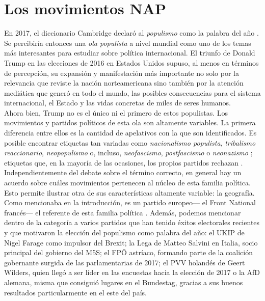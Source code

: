 \chapter{Los movimientos NAP}

En 2017, el diccionario Cambridge declaró al \textit{populismo} como la palabra del año \parencite{MuddeCambridge17}. Se percibiría entonces una \textit{ola populista} a nivel mundial como uno de los temas más interesantes para estudiar sobre política internacional. El triunfo de Donald Trump en las elecciones de 2016 en Estados Unidos supuso, al menos en términos de percepción, su expansión y manifestación más importante no solo por la relevancia que reviste la nación norteamericana sino también por la atención mediática que generó en todo el mundo, las posibles consecuencias para el sistema internacional, el Estado y las vidas concretas de miles de seres humanos.\\

Ahora bien, Trump no es el único ni el primero de estos populistas. Los movimientos y partidos políticos de esta ola son altamente variables. La primera diferencia entre ellos es la cantidad de apelativos con la que son identificados. Es posible encontrar etiquetas tan variadas como \textit{nacionalismo populista}, \textit{tribalismo reaccionario}, \textit{neopopulismo} o, incluso, \textit{neofascismo}, \textit{postfascismo} o \textit{neonazismo} \parencites{Mudde07a}{Mammone12}{Hainsworth16a}; etiquetas que, en la mayoría de las ocasiones, los propios partidos rechazan \parencites{LeParisien13}{Hainsworth16a}{Sputnik17}.\\ 

Independientemente del debate sobre el término correcto, en general hay un acuerdo sobre cuáles movimientos pertenecen al núcleo de esta familia política. Esto permite ilustrar otra de sus características altamente variable: la geografía. Como mencionaba en la introducción, es un partido europeo--- el Front National francés--- el referente de esta familia política \parencite{Mudde07a}. Además, podemos mencionar dentro de la categoría a varios partidos que han tenido éxitos electorales recientes y que motivaron la elección del populismo como palabra del año: el UKIP de Nigel Farage como impulsor del Brexit; la Lega de Matteo Salvini en Italia, socio principal del gobierno del M5S; el FPÖ astríaco, formando parte de la coalición gobernante surgida de las parlamentarias de 2017; el PVV holandés de Geert Wilders, quien llegó a ser líder en las encuestas hacia la elección de 2017 o la AfD alemana, misma que consiguió lugares en el Bundestag, gracias a sus buenos resultados particularmente en el este del país.\\ 

